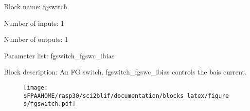 \pagebreak

Block name: fgswitch

Number of inputs: 1

Number of outputs: 1

Parameter list: fgswitch\_fgswc\_ibias

Block description: 
An FG switch. fgswitch\_fgswc\_ibias controls the bais current.

\begin{figure}[H]  %
\texttt{[image: \$FPAAHOME/rasp30/sci2blif/documentation/blocks\_latex/figures/fgswitch.pdf]}
\end{figure}

